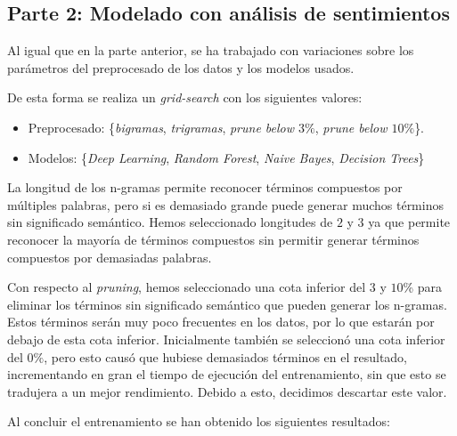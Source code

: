 \documentclass[es]{uc3mreport}
\begin{document}
\begin{report}
\subsection{Parte 2: Modelado con análisis de sentimientos}
\label{sec:parte2}

    Al igual que en la parte anterior, se ha trabajado con variaciones
    sobre los parámetros del preprocesado de los datos y los modelos usados.

    De esta forma se realiza un \textit{grid-search} con los siguientes valores:
    \begin{itemize}
        \item Preprocesado: \{\textit{bigramas}, \textit{trigramas}, \textit{prune below $3\%$}, \textit{prune below $10\%$}\}.
        \item Modelos: \{\textit{Deep Learning}, \textit{Random Forest}, \textit{Naive Bayes}, \textit{Decision Trees}\}
    \end{itemize}

    La longitud de los n-gramas permite reconocer términos compuestos por múltiples
    palabras, pero si es demasiado grande puede generar muchos términos sin significado
    semántico. Hemos seleccionado longitudes de $2$ y $3$ ya que permite reconocer
    la mayoría de términos compuestos sin permitir generar términos compuestos
    por demasiadas palabras.

    Con respecto al \textit{pruning}, hemos seleccionado una cota inferior del $3$ y $10$\%
    para eliminar los términos sin significado semántico que pueden generar los
    n-gramas. Estos términos serán muy poco frecuentes en los datos, por lo que
    estarán por debajo de esta cota inferior. Inicialmente también se seleccionó
    una cota inferior del $0\%$, pero esto causó que hubiese demasiados términos
    en el resultado, incrementando en gran el tiempo de ejecución del entrenamiento, sin que esto se tradujera a un mejor rendimiento.
    Debido a esto, decidimos descartar este valor.

    Al concluir el entrenamiento se han obtenido los siguientes resultados:


\end{report}
\end{document}
